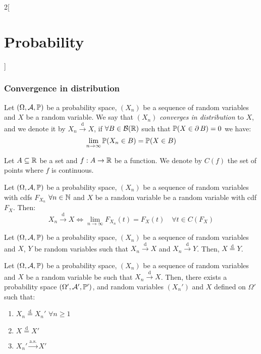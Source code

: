 \documentclass[../../../main.tex]{subfiles}
\begin{document}
\begin{multicols}{2}[\section{Probability}]
    \subsubsection{Convergence in distribution}
    \begin{definition}
        Let $(\Omega,\mathcal{A},\mathbb{P})$ be a probability space, $(X_n)$ be a sequence of random variables and $X$ be a random variable. We say that $(X_n)$ \emph{converges in distribution} to $X$, and we denote it by $X_n\overset{\text{d}}{\longrightarrow} X$, if $\forall B\in\mathcal{B}(\mathbb{R})$ such that $\mathbb{P}(X\in\operatorname{\partial} B)=0$ we have: $$\lim_{n\to\infty}\mathbb{P}(X_n\in B)=\mathbb{P}(X\in B)$$
    \end{definition}
    \begin{definition}
        Let $A\subseteq\mathbb{R}$ be a set and $f:A\rightarrow\mathbb{R}$ be a function. We denote by $C(f)$ the set of points where $f$ is continuous.
    \end{definition}
    \begin{prop}
        Let $(\Omega,\mathcal{A},\mathbb{P})$ be a probability space, $(X_n)$ be a sequence of random variables with cdfs $F_{X_n}$ $\forall n\in\mathbb{N}$ and $X$ be a random variable be a random variable with cdf $F_X$. Then: $$X_n\overset{\text{d}}{\longrightarrow} X\iff\lim_{n\to\infty} F_{X_n}(t)=F_X(t)\quad\forall t\in C(F_X)$$
    \end{prop}
    \begin{prop}
        Let $(\Omega,\mathcal{A},\mathbb{P})$ be a probability space, $(X_n)$ be a sequence of random variables and $X$, $Y$ be random variables such that $X_n\overset{\text{d}}{\longrightarrow} X$ and $X_n\overset{\text{d}}{\longrightarrow} Y$. Then, $X\overset{\text{d}}{=}Y$.
    \end{prop}
    \begin{theorem}
        Let $(\Omega,\mathcal{A},\mathbb{P})$ be a probability space, $(X_n)$ be a sequence of random variables and $X$ be a random variable be such that $X_n\overset{\text{d}}{\longrightarrow} X$. Then, there exists a probability space $(\Omega',\mathcal{A}',\mathbb{P}')$, and random variables $({X_n}')$ and $X$ defined on $\Omega'$ such that:
        \begin{enumerate}
            \item $X_n\overset{\text{d}}{=}{X_n}'$ $\forall n\geq 1$
            \item $X\overset{\text{d}}{=}X'$
            \item ${X_n}'\overset{\text{a.s.}}{\longrightarrow}X'$

\end{enumerate}
\end{theorem}
\end{multicols}
\end{document}
